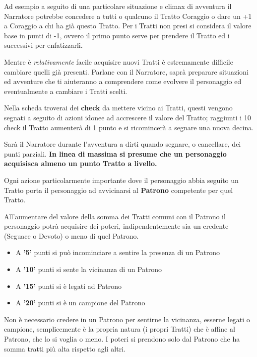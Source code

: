 \begin{multicols}{2}
Ad esempio a seguito di una particolare situazione e climax di avventura il Narratore potrebbe concedere a tutti o qualcuno il Tratto Coraggio o dare un +1 a Coraggio a chi ha già questo Tratto. Per i Tratti non presi si considera il valore base in punti di -1, ovvero il primo punto serve per prendere il Tratto ed i successivi per enfatizzarli.

Mentre è \emph{relativamente} facile acquisire nuovi Tratti è estremamente difficile cambiare quelli già presenti. Parlane con il Narratore, saprà preparare situazioni ed avventure che ti aiuteranno a comprendere come evolvere il personaggio ed eventualmente a cambiare i Tratti scelti.

Nella scheda troverai dei \textbf{check} da mettere vicino ai Tratti, questi vengono segnati a seguito di azioni idonee ad accrescere il valore del Tratto; raggiunti i 10 check il Tratto aumenterà di 1 punto e si ricomincerà a segnare una nuova decina.

Sarà il Narratore durante l'avventura a dirti quando segnare, o cancellare, dei punti parziali. \textbf{In linea di massima si presume che un personaggio acquisisca almeno un punto Tratto a livello.}

Ogni azione particolarmente importante dove il personaggio abbia seguito un Tratto porta il personaggio ad avvicinarsi al \textbf{Patrono} competente per quel Tratto.

All'aumentare del valore della somma dei Tratti comuni con il Patrono il personaggio potrà acquisire dei poteri, indipendentemente sia un credente (Seguace o Devoto) o meno di quel Patrono.

\noindent\begin{itemize}[leftmargin=*] \setlength{\itemsep}{0pt}
\item A \textbf{'5'} punti si può incominciare a sentire la presenza di un Patrono

\item A \textbf{'10'} punti si sente la vicinanza di un Patrono

\item A \textbf{'15'} punti si è legati ad Patrono

\item A \textbf{'20'} punti si è un campione del Patrono
\end{itemize}

Non è necessario credere in un Patrono per sentirne la vicinanza, esserne legati o campione, semplicemente è la propria natura (i propri Tratti) che è affine al Patrono, che lo si voglia o meno. I poteri si prendono solo dal Patrono che ha somma tratti più alta rispetto agli altri.


\end{multicols}
